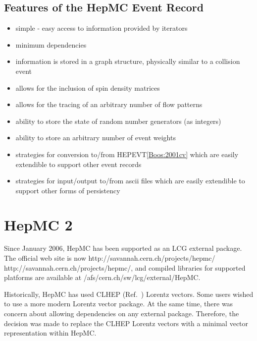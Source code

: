 \documentclass[11pt,letterpaper]{article}
\begin{document}
%
%

\subsection{Features of the HepMC Event Record}

\begin{itemize}\setlength{\itemsep}{0pt}
\item simple - easy access to information provided by iterators
\item minimum dependencies
\item information is stored in a graph structure, 
  physically similar to a collision event
\item allows for the inclusion of spin density matrices 
\item allows for the tracing of an arbitrary number of flow patterns
\item ability to store the state of random number generators (as
  integers)
\item ability to store an arbitrary number of event weights
\item strategies for conversion to/from HEPEVT\ref{Boos:2001cv} which
  are easily extendible to support other event records
\item strategies for input/output to/from ascii files which
  are easily extendible to support other forms of persistency
\end{itemize}

%
%

\section{HepMC 2}

Since January 2006, HepMC has been supported as an LCG external package.
The official web site is now \htmladdnormallink 
{http://savannah.cern.ch/projects/hepmc/} 
{http://savannah.cern.ch/projects/hepmc/}, 
and compiled libraries for supported platforms are available at 
/afs/cern.ch/sw/lcg/external/HepMC.

Historically, HepMC has used CLHEP (Ref.~\cite{clhep}) Lorentz vectors.  Some users wished to use
a more modern Lorentz vector package.  At the same time, 
there was concern about allowing dependencies on any external package.  
Therefore, the decision was made to replace the CLHEP Lorentz vectors with
a minimal vector representation within HepMC.  
\end{document}
